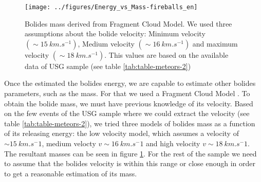 \begin{figure}
    \centering
    \texttt{[image: ../figures/Energy\_vs\_Mass-fireballs\_en]}
    \caption{Bolides mass derived from Fragment Cloud Model. We used three assumptions about the bolide velocity: Minimum velocity $(\sim \SI{15}{km.s^{-1}})$, Medium velocity $(\sim \SI{16}{km.s^{-1}})$ and maximum velocity $(\sim \SI{18}{km.s^{-1}})$. This values are based on the available data of USG sample (see table \ref{tab:table-meteors-2})}
    \label{fig:energy-mass}
\end{figure}

Once the estimated the bolides energy, we are capable to estimate other bolides parameters, such as the mass. For that we used a Fragment Cloud Model \citep{Wheeler:2017}. To obtain the bolide mass, we must have previous knowledge of its velocity. Based on the few events of the USG sample where we could extract the velocity (see table \ref{tab:table-meteors-2}), we tried three models of bolides mass as a function of its releasing energy: the low velocity model, which assumes a velocity of $\sim \SI{15}{km.s{^-1}}$, medium velocty $v \sim \SI{16}{km.s{^-1}}$ and high velocity $v \sim \SI{18}{km.s{^-1}}$. The resultant masses can be seen in figure \ref{fig:energy-mass}. For the rest of the sample we need to assume that the bolides velocity is within this range or close enough in order to get a reasonable estimation of its mass.